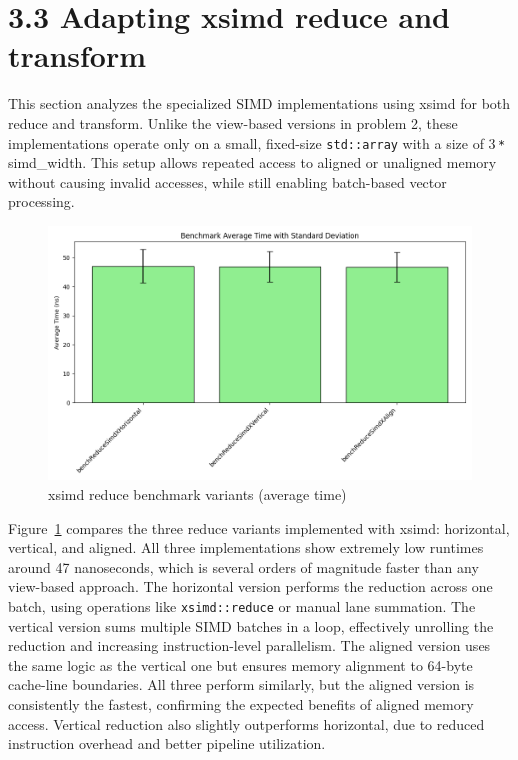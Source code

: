 \pagebreak

\section*{3.3 Adapting xsimd reduce and transform}

This section analyzes the specialized SIMD implementations using xsimd for both reduce and transform.
Unlike the view-based versions in problem 2, these implementations operate only on a small, fixed-size \texttt{std::array} with a size of 3\,\texttt{*}\,simd\_width.
This setup allows repeated access to aligned or unaligned memory without causing invalid accesses, while still enabling batch-based vector processing.

\begin{figure}[h!]
    \centering
    \includegraphics[width=0.9\linewidth]{img/simd_reduceVX_output.txt_ex02.png}
    \caption{xsimd reduce benchmark variants (average time)}
    \label{fig:simd_reduceVX_output}
\end{figure}

Figure~\ref{fig:simd_reduceVX_output} compares the three reduce variants implemented with xsimd: horizontal, vertical, and aligned.
All three implementations show extremely low runtimes around 47 nanoseconds, which is several orders of magnitude faster than any view-based approach.
The horizontal version performs the reduction across one batch, using operations like \texttt{xsimd::reduce} or manual lane summation.
The vertical version sums multiple SIMD batches in a loop, effectively unrolling the reduction and increasing instruction-level parallelism.
The aligned version uses the same logic as the vertical one but ensures memory alignment to 64-byte cache-line boundaries.
All three perform similarly, but the aligned version is consistently the fastest, confirming the expected benefits of aligned memory access.
Vertical reduction also slightly outperforms horizontal, due to reduced instruction overhead and better pipeline utilization.

